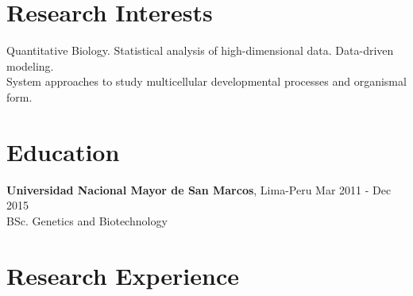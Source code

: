 \documentclass[margin,line]{res}
\begin{document}
\address{Calle Tambo Huascar 201, San Miguel, Lima-Peru}
\address{\textit{contact:} avallecam@gmail.com or (+51)950951722}

\begin{resume}

\vspace*{.15in}

\section{\sc Research Interests}

Quantitative Biology. Statistical analysis of high-dimensional data. Data-driven modeling.\\ %
System approaches to study multicellular developmental processes and organismal form.\\%




\section{\sc Education}
{\bf Universidad Nacional Mayor de San Marcos}, Lima-Peru \hfill Mar 2011 - Dec 2015\\
BSc. Genetics and Biotechnology\\

\section{\sc Research Experience}


\end{resume}
\end{document}
